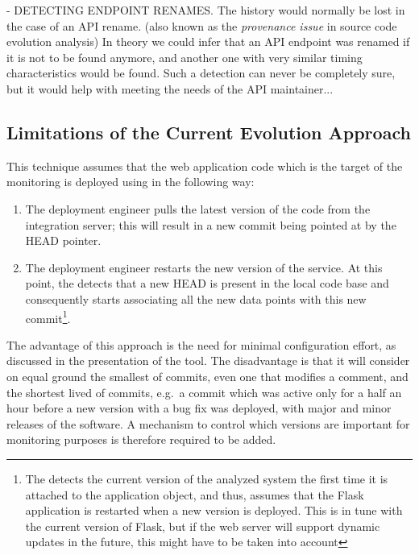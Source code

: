 -   DETECTING ENDPOINT RENAMES.  The history would normally be lost in the case of an API rename. (also known as the {\em provenance issue} in source code evolution analysis)
    In theory we could infer that an API endpoint was renamed if it is not to be found anymore, and another one with very similar timing characteristics would be found. Such a detection can never be completely sure, but it would help with meeting the needs of the API maintainer... 







  \subsection*{Limitations of the Current Evolution Approach}
  This technique assumes that the web application code which is the target of the monitoring is deployed using \git in the following way: 

  \begin{enumerate}
    \item The deployment engineer pulls the latest version of the code from the integration server; this will result in a new commit being pointed at by the HEAD pointer. %
    \item The deployment engineer restarts the new version of the service. At this point, the \tool detects that a new HEAD is present in the local code base and consequently starts associating all the new data points with this new commit\footnote{The \tool detects the current version of the analyzed system the first time it is attached to the application object, and thus, assumes that the Flask application is restarted when a new version is deployed. This is in tune with the current version of Flask, but if the web server will support dynamic updates in the future, this might have to be taken into account}.
  \end{enumerate}

    The advantage of this approach is the need for minimal configuration effort, as discussed in the presentation of the tool. The disadvantage is that it will consider on equal ground the smallest of commits, even one that modifies a comment, and the shortest lived of commits, e.g.~a commit which was active only for a half an hour before a new version with a bug fix was deployed, with major and minor releases of the software. %
  A mechanism to control which versions are important for monitoring purposes is therefore required to be added.
%



